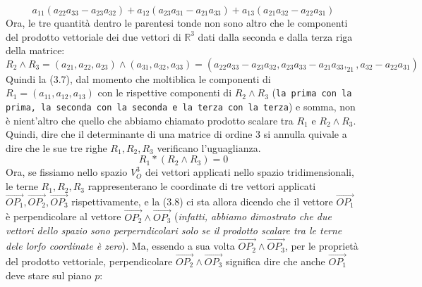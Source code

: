 \begin{equation}
	a_{11}(a_{22}a_{33}-a_{23}a_{32})+ a_{12}(a_{23}a_{31}-a_{21}a_{33})+a_{13}(a_{21}a_{32}-a_{22}a_{31})
\end{equation}
Ora, le tre quantità dentro le parentesi tonde non sono altro che le componenti del prodotto vettoriale dei due vettori di $\mathds{R}^3$ dati dalla seconda e dalla terza riga della matrice:
\begin{equation*}
	R_2\wedge R_3=(a_{21},a_{22},a_{23})\wedge(a_{31},a_{32},a_{33})=(a_{22}a_{33}-a_{23}a_{32},a_{23}a_{33}-a_{21}a_{33},_{21},a_{32}-a_{22}a_{31})
\end{equation*}
Quindi la (3.7), dal momento che moltiblica le componenti di $R_1=(a_{11},a_{12},a_{13})$ con le rispettive componenti di $R_2\wedge R_3$ ({\tt la prima con la prima, la seconda con la seconda e la terza con la terza}) e somma, non è nient'altro che quello che abbiamo chiamato prodotto scalare tra $R_1$ e $R_2 \wedge R_3$. Quindi, dire che il determinante di una matrice di ordine 3 si annulla quivale a dire che le sue tre righe $R_1,R_2,R_3$ verificano l'uguaglianza.
\begin{equation}
	R_1*(R_2\wedge R_3)=0
\end{equation}
Ora, se fissiamo nello spazio $V^{3}_O$ dei vettori applicati nello spazio tridimensionali, le terne $R_1, R_2, R_3$ rappresenterano le coordinate di tre vettori applicati $\vec{OP_1}, \vec{OP_2}, \vec{OP_3}$ rispettivamente, e la (3.8) ci sta allora dicendo che il vettore $\vec{OP_1}$ è perpendicolare al vettore $\vec{OP_2}\wedge \vec{OP_3}$ ({\it infatti, abbiamo dimostrato che due vettori dello spazio sono perperndicolari solo se il prodotto scalare tra le terne dele lorfo coordinate è zero}). Ma, essendo a sua volta $\vec{OP_2}\wedge \vec{OP_3}$, per le proprietà del prodotto vettoriale, perpendicolare $\vec{OP_2}\wedge \vec{OP_3}$ significa dire che anche $\vec{OP_1}$ deve stare sul piano $p$:

